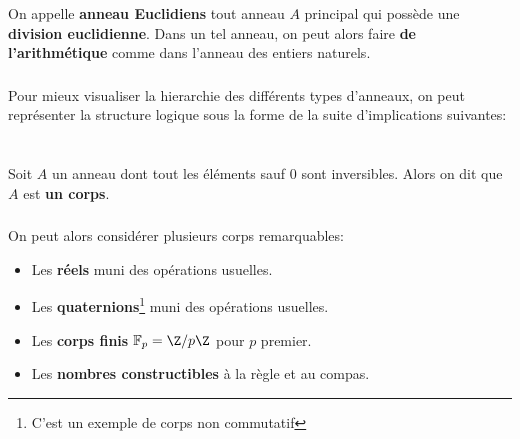 \subsection*{}
\subsection*{}
\subsection*{}
\subsection*{}
On appelle \textbf{anneau Euclidiens} tout anneau \(A\) principal qui possède une \textbf{division euclidienne}. Dans un tel anneau, on peut alors faire \textbf{de l'arithmétique} comme dans l'anneau des entiers naturels.
\subsection*{}
Pour mieux visualiser la hierarchie des différents types d'anneaux, on peut représenter la structure logique sous la forme de la suite d'implications suivantes:
\begin{center}
\end{center}

\chapter*{}
Soit \(A\) un anneau dont tout les éléments sauf \(0\) sont inversibles. Alors on dit que \(A\) est \textbf{un corps}.

\subsection*{}
On peut alors considérer plusieurs corps remarquables:
\begin{itemize}
   \item Les \textbf{réels} muni des opérations usuelles.
   \item Les \textbf{quaternions}\footnote[1]{C'est un exemple de corps non commutatif} muni des opérations usuelles.
   \item Les \textbf{corps finis} \(\mathbb{F}_p = \Z/p\Z\) pour \(p\) premier.
   \item Les \textbf{nombres constructibles} à la règle et au compas.
\end{itemize}


